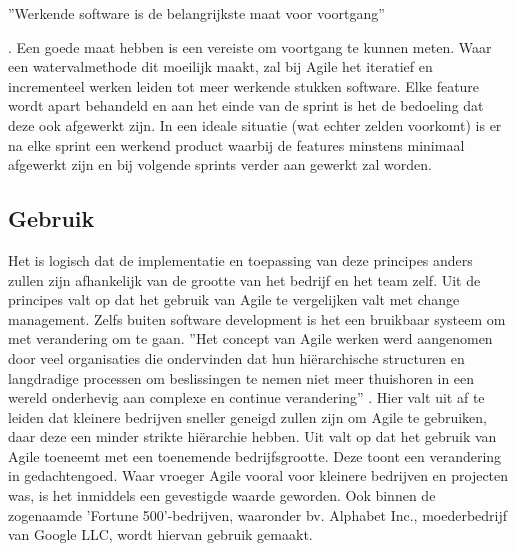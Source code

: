 ''Werkende software is de belangrijkste maat voor voortgang''

\autocite{Beck2001}. Een goede maat hebben is een vereiste om voortgang te kunnen meten. Waar een watervalmethode dit moeilijk maakt, zal bij Agile het iteratief en incrementeel werken leiden tot meer werkende stukken software. Elke feature wordt apart behandeld en aan het einde van de sprint is het de bedoeling dat deze ook afgewerkt zijn. In een ideale situatie (wat echter zelden voorkomt) is er na elke sprint een werkend product waarbij de features minstens minimaal afgewerkt zijn en bij volgende sprints verder aan gewerkt zal worden.

\subsection{Gebruik}
Het is logisch dat de implementatie en toepassing van deze principes anders zullen zijn afhankelijk van de grootte van het bedrijf en het team zelf. Uit de principes valt op dat het gebruik van Agile te vergelijken valt met change management. Zelfs buiten software development is het een bruikbaar systeem om met verandering om te gaan. 
''Het concept van Agile werken werd aangenomen door veel organisaties die ondervinden dat hun hiërarchische structuren en langdradige processen om beslissingen te nemen niet meer thuishoren in een wereld onderhevig aan complexe en continue verandering''
\autocite{Franklin2014}. Hier valt uit af te leiden dat kleinere bedrijven sneller geneigd zullen zijn om Agile te gebruiken, daar deze een minder strikte hiërarchie hebben. Uit \textcite{Salo2008} valt op dat het gebruik van Agile toeneemt met een toenemende bedrijfsgrootte. Deze toont een verandering in gedachtengoed. Waar vroeger Agile vooral voor kleinere bedrijven en projecten was, is het inmiddels een gevestigde waarde geworden. Ook binnen de zogenaamde 'Fortune 500'-bedrijven, waaronder bv. Alphabet Inc., moederbedrijf van Google LLC, wordt hiervan gebruik gemaakt. 

